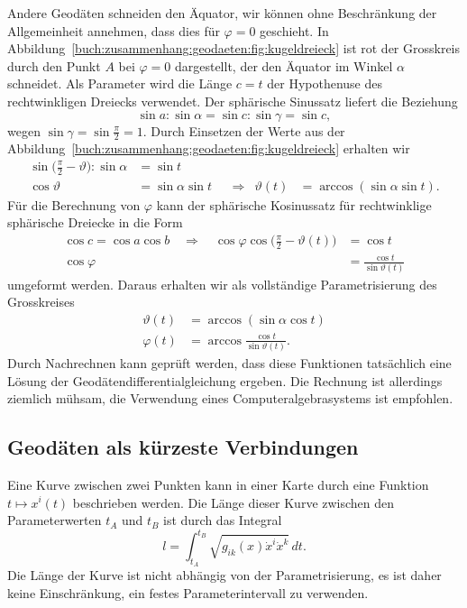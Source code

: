 Andere Geodäten schneiden den Äquator, wir können ohne Beschränkung der
Allgemeinheit annehmen, dass dies für $\varphi=0$ geschieht.
In Abbildung~\ref{buch:zusammenhang:geodaeten:fig:kugeldreieck}
ist rot der Grosskreis durch den Punkt $A$ bei $\varphi=0$ dargestellt,
der den Äquator im Winkel $\alpha$ schneidet.
Als Parameter wird die Länge $c=t$ der Hypothenuse des rechtwinkligen
Dreiecks verwendet.
Der sphärische Sinussatz liefert die Beziehung
\[
\sin a : \sin \alpha
=
\sin c : \sin\gamma
=
\sin c,
\]
wegen $\sin\gamma=\sin\frac{\pi}2=1$.
Durch Einsetzen der Werte aus der
Abbildung~\ref{buch:zusammenhang:geodaeten:fig:kugeldreieck}
erhalten wir
\begin{align*}
\sin\biggl(\frac{\pi}2-\vartheta\biggr) : \sin\alpha
&=
\sin t
\\
\cos\vartheta
&=
\sin\alpha \sin t
&&\Rightarrow&
\vartheta(t) &= \arccos(\sin\alpha\sin t).
\end{align*}
Für die Berechnung von $\varphi$ kann der sphärische Kosinussatz
für rechtwinklige sphärische Dreiecke in die Form
\begin{align*}
\cos c = \cos a\cos b
\quad\Rightarrow\quad
\cos\varphi\cos\biggl(\frac{\pi}2-\vartheta(t)\biggr)
&=
\cos t
\\
\cos\varphi
&= 
\frac{
\cos t
}{
\sin\vartheta(t)
}
\end{align*}
umgeformt werden.
Daraus erhalten wir als vollständige Parametrisierung des Grosskreises
\begin{equation}
\begin{aligned}
\vartheta(t)
&=
\arccos(\sin\alpha\cos t)
\\
\varphi(t)
&=
\arccos\frac{\cos t}{\sin\vartheta(t)}.
\end{aligned}
\label{buch:zusammenhang:geodaeten:eqn:kugelgeodaeten}
\end{equation}
Durch Nachrechnen kann geprüft werden, dass diese Funktionen tatsächlich
eine Lösung der Geodätendifferentialgleichung ergeben.
Die Rechnung ist allerdings ziemlich mühsam, die Verwendung eines
Computeralgebrasystems ist empfohlen.


%
%
\subsection{Geodäten als kürzeste Verbindungen
\label{buch:zusammenhang:geodaeten:subsection:kuerzeste}}
Eine Kurve zwischen zwei Punkten kann in einer Karte durch eine Funktion
\(
t\mapsto x^i(t)
\)
beschrieben werden.
Die Länge dieser Kurve zwischen den Parameterwerten $t_A$ und $t_B$
ist durch das Integral
\begin{equation}
l
=
\int_{t_A}^{t_B}
\sqrt{g_{ik}(x) \dot{x}^i \dot{x}^k }
\,dt.
\label{buch:zusammenhang:geodaeten:eqn:funktional}
\end{equation}
Die Länge der Kurve ist nicht abhängig von der Parametrisierung, es ist
daher keine Einschränkung, ein festes Parameterintervall zu verwenden.

